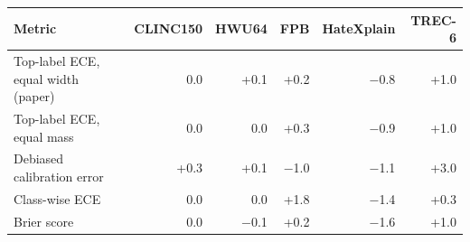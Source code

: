 \begin{tabular}{lrrrrr}
\toprule
Metric & CLINC150 & HWU64 & FPB & HateXplain & TREC-6 \\
\midrule
Top-label ECE, equal width (paper) & 0.0 & +0.1 & +0.2 & $-$0.8 & +1.0 \\
Top-label ECE, equal mass & 0.0 & 0.0 & +0.3 & $-$0.9 & +1.0 \\
Debiased calibration error & +0.3 & +0.1 & $-$1.0 & $-$1.1 & +3.0 \\
Class-wise ECE & 0.0 & 0.0 & +1.8 & $-$1.4 & +0.3 \\
Brier score & 0.0 & $-$0.1 & +0.2 & $-$1.6 & +1.0 \\
\bottomrule
\end{tabular}
